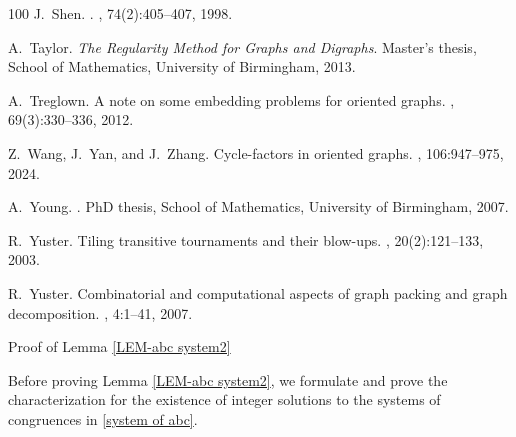 \documentclass[11pt,a4paper,reqno]{amsart}
\makeatletter
\renewcommand\section{\@startsection{section}{1}%
  \z@{-1.0\linespacing\@plus-.7\linespacing}{1\linespacing}%
  {\normalfont\bfseries\large\centering}}
\theoremstyle{definition} %
\makeatother
\begin{document}
\begin{thebibliography}{100}
	J.~Shen.
	.
	, 74(2):405--407, 1998.
	
	A.~Taylor.
	\newblock \textit{The Regularity Method for Graphs and Digraphs}.
	\newblock Master's thesis, School of Mathematics, University of Birmingham,
	2013.
	
	A.~Treglown.
	\newblock A note on some embedding problems for oriented graphs.
	, 69(3):330--336, 2012.
	
	Z.~Wang, J.~Yan, and J.~Zhang.
	\newblock Cycle-factors in oriented graphs.
	, 106:947--975, 2024.
	
	A.~Young.
	.
	\newblock PhD thesis, School of Mathematics, University of Birmingham, 2007.
	
	R.~Yuster.
	\newblock Tiling transitive tournaments and their blow-ups.
	, 20(2):121--133, 2003.
	
	R.~Yuster.
	\newblock Combinatorial and computational aspects of graph packing and graph
	decomposition.
	, 4:1--41, 2007.
	
\end{thebibliography}




\newpage
\appendix
\section{Proof of Lemma \ref{LEM-abc system2}}
\label{APP:A}

Before proving Lemma \ref{LEM-abc system2}, we formulate and prove the characterization for the existence of integer solutions to the systems of congruences in \eqref{system of abc}.
\end{document}
